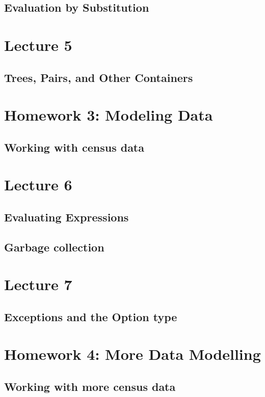 \documentclass{book}
\begin{document}
\section{Evaluation by Substitution}

\chapter{Lecture 5}

\section{Trees, Pairs, and Other Containers}


\chapter{Homework 3: Modeling Data}

\section{Working with census data}

\chapter{Lecture 6}

\section{Evaluating Expressions}

\section{Garbage collection}

\chapter{Lecture 7}

\section{Exceptions and the Option type}

\chapter{Homework 4: More Data Modelling}

\section{Working with more census data}
\end{document}
